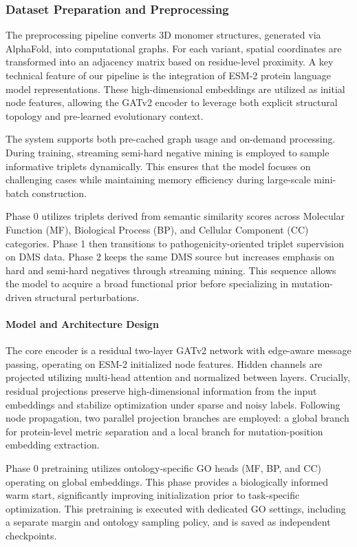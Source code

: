 \documentclass[unnumsec,webpdf,contemporary,large]{oup-authoring-template}%
\theoremstyle{thmstyleone}%
\theoremstyle{thmstyletwo}%
\theoremstyle{thmstylethree}%
\begin{document}
\subsubsection{Dataset Preparation and Preprocessing}
The preprocessing pipeline converts 3D monomer structures, generated via AlphaFold, into computational graphs. For each variant, spatial coordinates are transformed into an adjacency matrix based on residue-level proximity. A key technical feature of our pipeline is the integration of ESM-2 protein language model representations. These high-dimensional embeddings are utilized as initial node features, allowing the GATv2 encoder to leverage both explicit structural topology and pre-learned evolutionary context.

The system supports both pre-cached graph usage and on-demand processing. During training, streaming semi-hard negative mining is employed to sample informative triplets dynamically. This ensures that the model focuses on challenging cases while maintaining memory efficiency during large-scale mini-batch construction.

Phase 0 utilizes triplets derived from semantic similarity scores across Molecular Function (MF), Biological Process (BP), and Cellular Component (CC) categories. Phase 1 then transitions to pathogenicity-oriented triplet supervision on DMS data. Phase 2 keeps the same DMS source but increases emphasis on hard and semi-hard negatives through streaming mining. This sequence allows the model to acquire a broad functional prior before specializing in mutation-driven structural perturbations.


\paragraph{Model and Architecture Design}
The core encoder is a residual two-layer GATv2 network with edge-aware message passing, operating on ESM-2 initialized node features. Hidden channels are projected utilizing multi-head attention and normalized between layers. Crucially, residual projections preserve high-dimensional information from the input embeddings and stabilize optimization under sparse and noisy labels. Following node propagation, two parallel projection branches are employed: a global branch for protein-level metric separation and a local branch for mutation-position embedding extraction.

Phase 0 pretraining utilizes ontology-specific GO heads (MF, BP, and CC) operating on global embeddings. This phase provides a biologically informed warm start, significantly improving initialization prior to task-specific optimization. This pretraining is executed with dedicated GO settings, including a separate margin and ontology sampling policy, and is saved as independent checkpoints.
\end{document}
